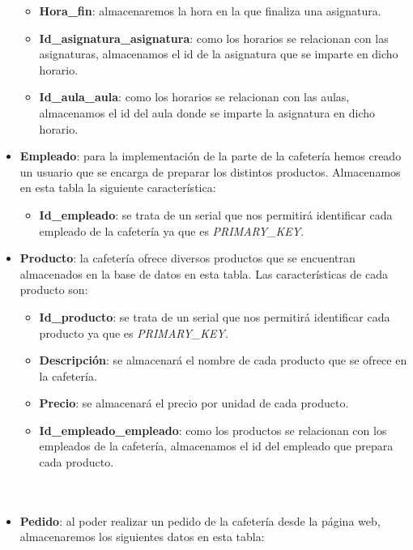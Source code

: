 \documentclass[12pt]{report}
\begin{document}
\begin{itemize}
\begin{itemize}
        \item \textbf{Hora\_fin}: almacenaremos la hora en la que finaliza una asignatura.
        \item \textbf{Id\_asignatura\_asignatura}: como los horarios se relacionan con las asignaturas, almacenamos el id de la asignatura que se imparte en dicho horario.
        \item \textbf{Id\_aula\_aula}: como los horarios se relacionan con las aulas, almacenamos el id del aula donde se imparte la asignatura en dicho horario.
        \\
    \end{itemize} 
    \item  \textbf{Empleado}: para la implementación de la parte de la cafetería hemos creado un usuario que se encarga de preparar los distintos productos. Almacenamos en esta tabla la siguiente característica:
    \begin{itemize}
        \item\textbf{Id\_empleado}: se trata de un serial que nos permitirá identificar cada empleado de la cafetería ya que es \textit{PRIMARY\_KEY}.
        \\
    \end{itemize} 
    \item  \textbf{Producto}: la cafetería ofrece diversos productos que se encuentran almacenados en la base de datos en esta tabla. Las características de cada producto son:
    \begin{itemize}
        \item\textbf{Id\_producto}: se trata de un serial que nos permitirá identificar cada producto ya que es \textit{PRIMARY\_KEY}.
        \item \textbf{Descripción}: se almacenará el nombre de cada producto que se ofrece en la cafetería.
        \item \textbf{Precio}: se almacenará el precio por unidad de cada producto.
        \item \textbf{Id\_empleado\_empleado}: como los productos se relacionan con los empleados de la cafetería, almacenamos el id del empleado que prepara cada producto.
        \\\\\\
    \end{itemize} 
    \item \textbf{Pedido}: al poder realizar un pedido de la cafetería desde la página web, almacenaremos los siguientes datos en esta tabla:
    \begin{itemize}

\end{itemize}
\end{itemize}
\end{document}
